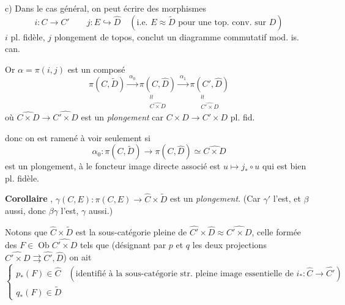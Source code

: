 \documentclass[11pt,a4paper]{article}
\begin{document}

c) Dans le cas général, on peut écrire  des morphismes 
\[
i : C \to C' \qquad j : E \hookrightarrow \widehat{D} \quad (\text{i.e. } E \approx \widetilde{D} \text{ pour une top. conv. sur } D)
\]
 $i$ pl. fidèle, $j$ plongement de topos,  conclut un diagramme commutatif mod. is. can.




Or $\alpha = \pi(i, j)$ est un composé
\[
\pi(C, \widetilde{D}) \xrightarrow{\ \alpha_0\ } \underset{\substack{\wr\wr \\ \widehat{C \times D}}}{\pi(C, \widehat{D})} \xrightarrow{\ \alpha_1\ } \underset{\substack{\wr\wr \\ \widehat{C' \times D}}}{\pi(C', \widehat{D})}
\]
où $\widehat{C \times D} \to \widehat{C' \times D}$ est un \emph{plongement} car $C \times D \to C' \times D$ pl. fid.

donc on est ramené à voir seulement si
\[
\alpha_0 : \pi(C, \widetilde{D}) \longrightarrow \pi(C, \widehat{D}) \simeq \widehat{C \times D}
\]
est un plongement, à le foncteur image  directe associé est   $u \longmapsto j_* \circ u$ qui est bien pl. fidèle.

\textbf{Corollaire} \struck{\ill{}}, $\gamma(C, E) : \pi(C, E) \to \widehat{C} \times \widetilde{D}$ est un \emph{plongement}. (Car $\gamma'$ l'est, et $\beta$ aussi, donc $\beta\gamma$ l'est, $\gamma$ aussi.)

Notons que \struck{\ill{}} $\widehat{C} \times \widetilde{D}$ est la sous-catégorie  pleine de $\widehat{C'} \times \widehat{D} \approx \widehat{C' \times D}$, \struck{\ill{}} celle formée des $F \in \operatorname{Ob} \widehat{C' \times D}$ tels que (désignant par $p$ et $q$ les deux projections $\widehat{C' \times D} \rightrightarrows \widehat{C'}, \widehat{D}$) on ait
\[
\begin{cases}
p_*(F) \in \widehat{C} & (\text{identifié à la sous-catégorie str. pleine image essentielle de } i_* : \widehat{C} \to \widehat{C'}) \\
q_*(F) \in \widetilde{D}
\end{cases}
\]
\end{document}
